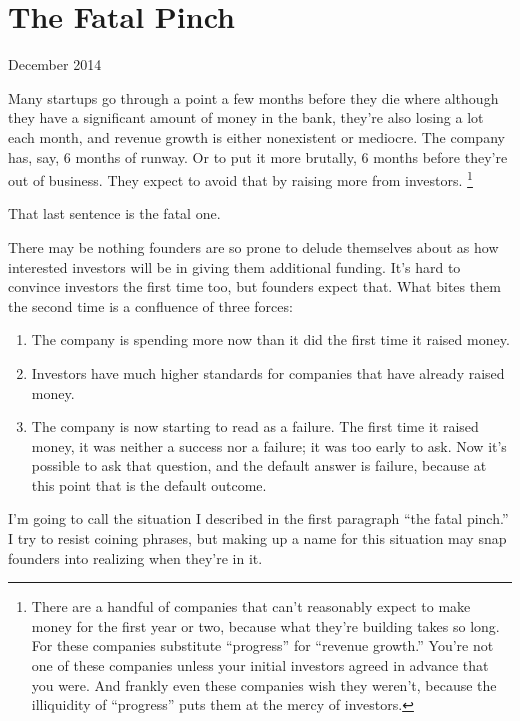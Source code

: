 \chapter{The Fatal Pinch}

December 2014

Many startups go through a point a few months before they die where
although they have a significant amount of money in the bank, they're
also losing a lot each month, and revenue growth is either nonexistent
or mediocre. The company has, say, 6 months of runway. Or to put it more
brutally, 6 months before they're out of business. They expect to avoid
that by raising more from investors. \footnote{There are a handful of companies that can't reasonably expect to
make money for the first year or two, because what they're building
takes so long. For these companies substitute ``progress'' for ``revenue
growth.'' You're not one of these companies unless your initial
investors agreed in advance that you were. And frankly even these
companies wish they weren't, because the illiquidity of ``progress''
puts them at the mercy of investors.}

That last sentence is the fatal one.

There may be nothing founders are so prone to delude themselves about as
how interested investors will be in giving them additional funding. It's
hard to convince investors the first time too, but founders expect that.
What bites them the second time is a confluence of three forces:

\begin{enumerate}
\def\labelenumi{\arabic{enumi}.}
\item
  The company is spending more now than it did the first time it raised
  money.
\item
  Investors have much higher standards for companies that have already
  raised money.
\item
  The company is now starting to read as a failure. The first time it
  raised money, it was neither a success nor a failure; it was too early
  to ask. Now it's possible to ask that question, and the default answer
  is failure, because at this point that is the default outcome.
\end{enumerate}

I'm going to call the situation I described in the first paragraph ``the
fatal pinch.'' I try to resist coining phrases, but making up a name for
this situation may snap founders into realizing when they're in it.


